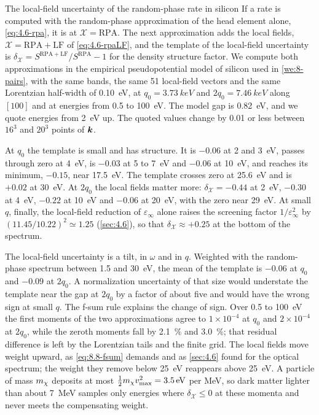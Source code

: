 \begin{workedexample}{The local-field uncertainty of the random-phase rate in silicon}\label{we:8-lf-nuisance}
If a rate is computed with the random-phase approximation of the head element alone, \cref{eq:4.6-rpa}, it is at $\mathcal{X} = \mathrm{RPA}$. The next approximation adds the local fields, $\mathcal{X} = \mathrm{RPA + LF}$ of \cref{eq:4.6-rpaLF}, and the template of the local-field uncertainty is $\delta_{\mathcal{X}} = S^{\mathrm{RPA+LF}}/S^{\mathrm{RPA}} - 1$ for the density structure factor. We compute both approximations in the empirical pseudopotential model of silicon used in \cref{we:8-pairs}, with the same bands, the same 51 local-field vectors and the same Lorentzian half-width of \SI{0.10}{eV}, at $q_0 = \SI{3.73}{keV}$ and $2q_0 = \SI{7.46}{keV}$ along $[100]$ and at energies from 0.5 to \SI{100}{eV}. The model gap is \SI{0.82}{eV}, and we quote energies from \SI{2}{eV} up. The quoted values change by 0.01 or less between $16^3$ and $20^3$ points of $\bm{k}$.

At $q_0$ the template is small and has structure. It is $-0.06$ at 2 and \SI{3}{eV}, passes through zero at \SI{4}{eV}, is $-0.03$ at 5 to \SI{7}{eV} and $-0.06$ at \SI{10}{eV}, and reaches its minimum, $-0.15$, near \SI{17.5}{eV}. The template crosses zero at \SI{25.6}{eV} and is $+0.02$ at \SI{30}{eV}. At $2q_0$ the local fields matter more: $\delta_{\mathcal{X}} = -0.44$ at \SI{2}{eV}, $-0.30$ at \SI{4}{eV}, $-0.22$ at \SI{10}{eV} and $-0.06$ at \SI{20}{eV}, with the zero near \SI{29}{eV}. At small $q$, finally, the local-field reduction of $\varepsilon_\infty$ alone raises the screening factor $1/\varepsilon_\infty^2$ by $(11.45/10.22)^2 \simeq 1.25$ (\cref{sec:4.6}), so that $\delta_{\mathcal{X}} \approx +0.25$ at the bottom of the spectrum.

The local-field uncertainty is a tilt, in $\omega$ and in $q$. Weighted with the random-phase spectrum between 1.5 and \SI{30}{eV}, the mean of the template is $-0.06$ at $q_0$ and $-0.09$ at $2q_0$. A normalization uncertainty of that size would understate the template near the gap at $2q_0$ by a factor of about five and would have the wrong sign at small $q$. The f-sum rule explains the change of sign. Over 0.5 to \SI{100}{eV} the first moments of the two approximations agree to $1\times10^{-4}$ at $q_0$ and $2\times10^{-4}$ at $2q_0$, while the zeroth moments fall by \SI{2.1}{\percent} and \SI{3.0}{\percent}; that residual difference is left by the Lorentzian tails and the finite grid. The local fields move weight upward, as \cref{eq:8.8-fsum} demands and as \cref{sec:4.6} found for the optical spectrum; the weight they remove below \SI{25}{eV} reappears above \SI{25}{eV}. A particle of mass $m_{\chi}$ deposits at most $\tfrac12m_{\chi} v_{\mathrm{max}}^2 = \SI{3.5}{eV}$ per MeV, so dark matter lighter than about \SI{7}{MeV} samples only energies where $\delta_{\mathcal{X}} \le 0$ at these momenta and never meets the compensating weight.


\end{workedexample}
